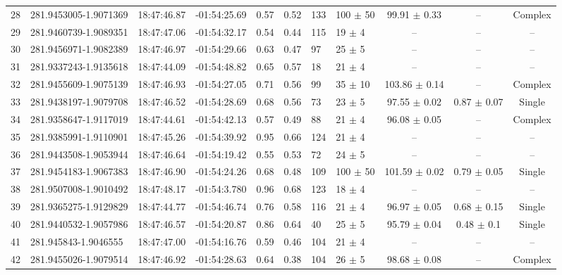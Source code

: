 \documentclass[longauth]{aa} %
\begin{document}
\begin{appendix}
\begin{table}[htbp!]
\begin{tabular}{llllllllccc}
28  &  281.9453005-1.9071369  &  18:47:46.87  &  -01:54:25.69  &  0.57  &  0.52  &  133  &  100 $\pm$ 50  &  99.91 $\pm$ 0.33  &  --  &  Complex \\
29  &  281.9460739-1.9089351  &  18:47:47.06  &  -01:54:32.17  &  0.54  &  0.44  &  115  &  19 $\pm$ 4  &  --  &  --  &  -- \\
30  &  281.9456971-1.9082389  &  18:47:46.97  &  -01:54:29.66  &  0.63  &  0.47  &  97  &  25 $\pm$ 5  &  --  &  --  &  -- \\
31  &  281.9337243-1.9135618  &  18:47:44.09  &  -01:54:48.82  &  0.65  &  0.57  &  18  &  21 $\pm$ 4  &  --  &  --  &  -- \\
32  &  281.9455609-1.9075139  &  18:47:46.93  &  -01:54:27.05  &  0.71  &  0.56  &  99  &  35 $\pm$ 10  &  103.86 $\pm$ 0.14  &  --  &  Complex \\
33  &  281.9438197-1.9079708  &  18:47:46.52  &  -01:54:28.69  &  0.68  &  0.56  &  73  &  23 $\pm$ 5  &  97.55 $\pm$ 0.02  &  0.87 $\pm$ 0.07  &  Single \\
34  &  281.9358647-1.9117019  &  18:47:44.61  &  -01:54:42.13  &  0.57  &  0.49  &  88  &  21 $\pm$ 4  &  96.08 $\pm$ 0.05  &  --  &  Complex \\
35  &  281.9385991-1.9110901  &  18:47:45.26  &  -01:54:39.92  &  0.95  &  0.66  &  124  &  21 $\pm$ 4  &  --  &  --  &  -- \\
36  &  281.9443508-1.9053944  &  18:47:46.64  &  -01:54:19.42  &  0.55  &  0.53  &  72  &  24 $\pm$ 5  &  --  &  --  &  -- \\
37  &  281.9454183-1.9067383  &  18:47:46.90  &  -01:54:24.26  &  0.68  &  0.48  &  109  &  100 $\pm$ 50  &  101.59 $\pm$ 0.02  &  0.79 $\pm$ 0.05  &  Single \\
38  &  281.9507008-1.9010492  &  18:47:48.17  &  -01:54:3.780  &  0.96  &  0.68  &  123  &  18 $\pm$ 4  &  --  &  --  &  -- \\
39  &  281.9365275-1.9129829  &  18:47:44.77  &  -01:54:46.74  &  0.76  &  0.58  &  116  &  21 $\pm$ 4  &  96.97 $\pm$ 0.05  &  0.68 $\pm$ 0.15  &  Single \\
40  &  281.9440532-1.9057986  &  18:47:46.57  &  -01:54:20.87  &  0.86  &  0.64  &  40  &  25 $\pm$ 5  &  95.79 $\pm$ 0.04  &  0.48 $\pm$ 0.1  &  Single \\
41  &  281.945843-1.9046555  &  18:47:47.00  &  -01:54:16.76  &  0.59  &  0.46  &  104  &  21 $\pm$ 4  &  --  &  --  &  -- \\
42  &  281.9455026-1.9079514  &  18:47:46.92  &  -01:54:28.63  &  0.64  &  0.38  &  104  &  26 $\pm$ 5  &  98.68 $\pm$ 0.08  &  --  &  Complex \\

\end{tabular}
\end{table}
\end{appendix}
\end{document}
